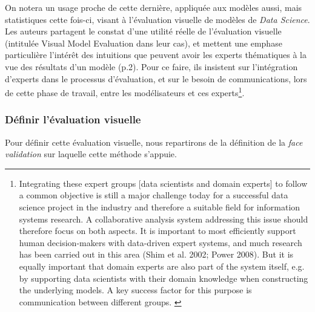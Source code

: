 On notera un usage proche de cette dernière, appliquée aux modèles aussi, mais statistiques cette fois-ci, visant à l'évaluation visuelle de modèles de \og \textit{Data Science}\fg{}. Les auteurs \autocite{eilers_its_2017} partagent le constat d'une utilité réelle de l'évaluation visuelle (intitulée \og Visual Model Evaluation\fg{} dans leur cas), et mettent une emphase particulière l'intérêt des intuitions que peuvent avoir les experts thématiques à la vue des résultats d'un modèle (p.2). Pour ce faire, ils insistent sur l'intégration d'experts dans le processus d'évaluation, et sur le besoin de communications, lors de cette phase de travail, entre les modélisateurs et ces experts\footnote{
\og Integrating these expert groups [data scientists and domain experts] to follow a common objective is still a major challenge today for a successful data science project in the industry and therefore a suitable field for information systems research.
A collaborative analysis system addressing this issue should therefore focus on both aspects. It is important to most efficiently support human decision-makers with data-driven expert systems, and much research has been carried out in this area (Shim et al. 2002; Power 2008).
But it is equally important that domain experts are also part of the system itself, e.g. by supporting data scientists with their domain knowledge when constructing the underlying models.
A key success factor for this purpose is communication between different groups.\fg{} \autocite[2]{eilers_its_2017}
}.


\subsubsection{Définir l'évaluation visuelle} Pour définir cette évaluation visuelle, nous repartirons de la définition de la \textit{face validation} sur laquelle cette méthode s'appuie.

